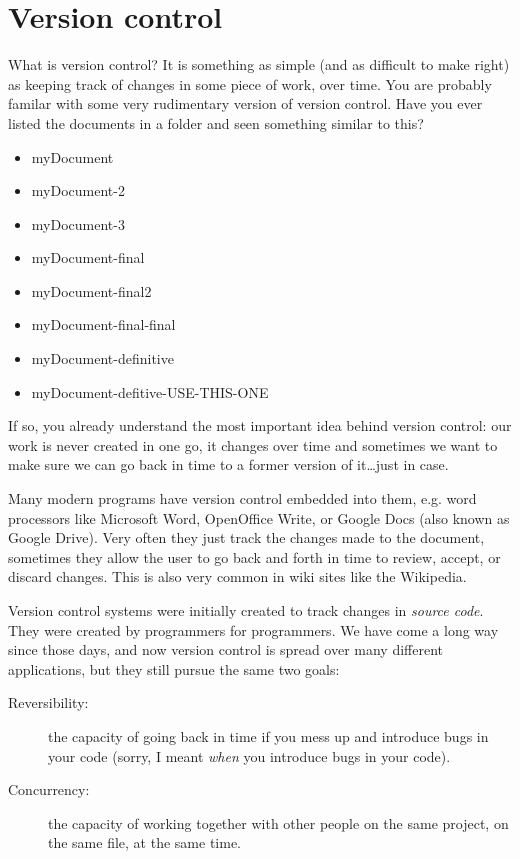 

\section{Version control}
\label{sec:version-control}

What is version control? It is something as simple (and as difficult
to make right) as keeping track of changes in some piece of work, over
time. You
are probably familar with some very rudimentary version of version
control. Have you ever listed the documents in a folder and seen
something similar to this?

\begin{itemize}
\item myDocument
\item myDocument-2
\item myDocument-3
\item myDocument-final
\item myDocument-final2
\item myDocument-final-final
\item myDocument-definitive
\item myDocument-defitive-USE-THIS-ONE
\end{itemize}

If so, you already understand the most important idea behind version
control: our work is never created in one go, it changes over time and
sometimes we want to make sure we can go back in time to a former
version of it\ldots just in case. 

Many modern programs have version control embedded into them,
e.g. word processors like Microsoft Word, OpenOffice Write, or Google
Docs (also known as Google Drive). Very often they just track the
changes made to the document, sometimes they allow the user to go back
and forth in time to review, accept, or discard changes. This is also
very common in wiki sites like the Wikipedia. 


Version control systems were initially created to track changes in
\emph{source code}. They were created by programmers for
programmers. We have come a long way since those days, and now version
control is spread over many different applications, but they still
pursue the same two goals: 

\begin{description}
\item[Reversibility: ] the capacity of going back in time if you mess
  up and introduce bugs in your code (sorry, I meant \emph{when} you
  introduce bugs in your code).
\item[Concurrency: ] the capacity of working together with other
  people on the same project, on the same file, at the same time. 
\end{description}


